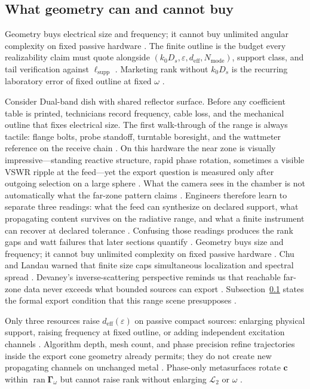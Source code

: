 \subsection{What geometry can and cannot buy}
\label{sec:ch495}
Geometry buys electrical size and frequency; it cannot buy unlimited angular complexity on fixed passive hardware \cite{chu1948}. The finite outline is the budget every realizability claim must quote alongside $(k_0 D_s,\varepsilon,d_{\mathrm{eff}},N_{\mathrm{mode}})$, support class, and tail verification against $\ell_{\mathrm{supp}}$ \cite{stratton1941}. Marketing rank without $k_0 D_s$ is the recurring laboratory error of fixed outline at fixed $\omega$ \cite{devaney2004}.
\begin{physicalvignette}
Consider Dual-band dish with shared reflector surface. Before any coefficient table is printed, technicians record frequency, cable loss, and the mechanical outline that fixes electrical size. The first walk-through of the range is always tactile: flange bolts, probe standoff, turntable boresight, and the wattmeter reference on the receive chain \cite{hansen1988}.
On this hardware the near zone is visually impressive---standing reactive structure, rapid phase rotation, sometimes a visible VSWR ripple at the feed---yet the export question is measured only after outgoing selection on a large sphere \cite{harrington2001}. What the camera sees in the chamber is not automatically what the far-zone pattern claims \cite{stratton1941}.
Engineers therefore learn to separate three readings: what the feed can synthesize on declared support, what propagating content survives on the radiative range, and what a finite instrument can recover at declared tolerance \cite{devaney2004}. Confusing those readings produces the rank gaps and watt failures that later sections quantify \cite{pal2026}.
Geometry buys size and frequency; it cannot buy unlimited complexity on fixed passive hardware . 
Chu and Landau warned that finite size caps simultaneous localization and spectral spread \cite{chu1948}. Devaney's inverse-scattering perspective reminds us that reachable far-zone data never exceeds what bounded sources can export \cite{devaney2004}.
Subsection~\ref{sec:ch495} states the formal export condition that this range scene presupposes \cite{stratton1941}.
\end{physicalvignette}
Only three resources raise $d_{\mathrm{eff}}(\varepsilon)$ on passive compact sources: enlarging physical support, raising frequency at fixed outline, or adding independent excitation channels \cite{chu1948}. Algorithm depth, mesh count, and phase precision refine trajectories inside the export cone geometry already permits; they do not create new propagating channels on unchanged metal \cite{harrington2001}. Phase-only metasurfaces rotate $\mathbf{c}$ within $\operatorname{ran}\boldsymbol{\Gamma}_\omega$ but cannot raise rank without enlarging $\mathcal{L}_{2}$ or $\omega$ \cite{stratton1941}.
